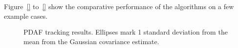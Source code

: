 Figure~\ref{} to~\ref{} show the comparative performance of the algorithms on a few example cases.

\begin{figure} \centering
{}
\caption{PDAF tracking results. Ellipses mark 1 standard deviation from the mean from the Gaussian covariance estimate.}%
\label{fig:Tracking_PDAF}%
\end{figure}

